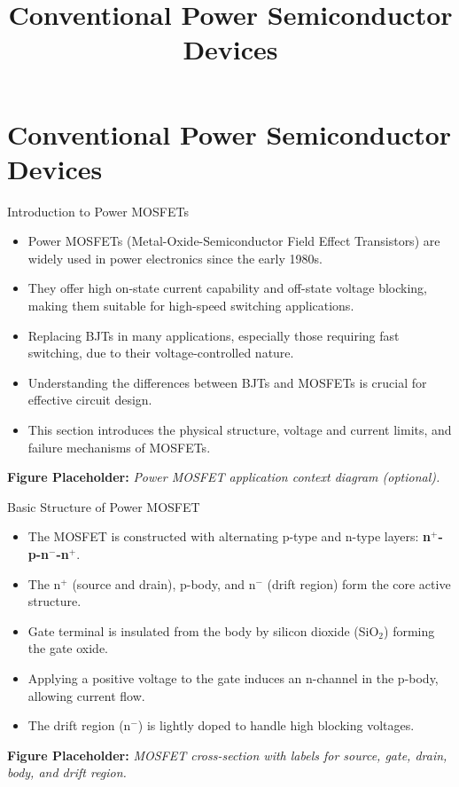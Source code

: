 \section{Conventional Power Semiconductor Devices}
\title{Conventional Power Semiconductor Devices}  

\begin{frame}[plain]
    \titlepage
\end{frame}

\begin{frame}{Introduction to Power MOSFETs}
\begin{itemize}
    \item Power MOSFETs (Metal-Oxide-Semiconductor Field Effect Transistors) are widely used in power electronics since the early 1980s.
    \item They offer high on-state current capability and off-state voltage blocking, making them suitable for high-speed switching applications.
    \item Replacing BJTs in many applications, especially those requiring fast switching, due to their voltage-controlled nature.
    \item Understanding the differences between BJTs and MOSFETs is crucial for effective circuit design.
    \item This section introduces the physical structure, voltage and current limits, and failure mechanisms of MOSFETs.
\end{itemize}

\vspace{0.5cm}
\textbf{Figure Placeholder:} \textit{Power MOSFET application context diagram (optional).}
\end{frame}


\begin{frame}{Basic Structure of Power MOSFET}
\begin{itemize}
    \item The MOSFET is constructed with alternating p-type and n-type layers: \textbf{n$^+$-p-n$^-$-n$^+$}.
    \item The n$^+$ (source and drain), p-body, and n$^-$ (drift region) form the core active structure.
    \item Gate terminal is insulated from the body by silicon dioxide (SiO$_2$) forming the gate oxide.
    \item Applying a positive voltage to the gate induces an n-channel in the p-body, allowing current flow.
    \item The drift region (n$^-$) is lightly doped to handle high blocking voltages.
\end{itemize}

\vspace{0.5cm}
\textbf{Figure Placeholder:} \textit{MOSFET cross-section with labels for source, gate, drain, body, and drift region.}
\end{frame}

